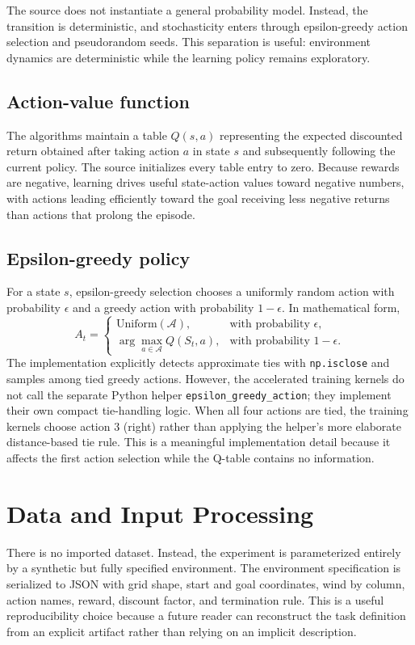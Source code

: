 \documentclass[11pt,a4paper]{article}
\begin{document}
The source does not instantiate a general probability model. Instead, the transition is deterministic, and stochasticity enters through epsilon-greedy action selection and pseudorandom seeds. This separation is useful: environment dynamics are deterministic while the learning policy remains exploratory.

\subsection{Action-value function}
The algorithms maintain a table $Q(s,a)$ representing the expected discounted return obtained after taking action $a$ in state $s$ and subsequently following the current policy. The source initializes every table entry to zero. Because rewards are negative, learning drives useful state-action values toward negative numbers, with actions leading efficiently toward the goal receiving less negative returns than actions that prolong the episode.

\subsection{Epsilon-greedy policy}
For a state $s$, epsilon-greedy selection chooses a uniformly random action with probability $\epsilon$ and a greedy action with probability $1-\epsilon$. In mathematical form,
\begin{equation}
A_t=
\begin{cases}
\text{Uniform}(\mathcal{A}), & \text{with probability }\epsilon,\\
\arg\max\limits_{a\in\mathcal{A}}Q(S_t,a), & \text{with probability }1-\epsilon.
\end{cases}
\label{eq:egreedy}
\end{equation}
The implementation explicitly detects approximate ties with \texttt{np.isclose} and samples among tied greedy actions. However, the accelerated training kernels do not call the separate Python helper \texttt{epsilon\_greedy\_action}; they implement their own compact tie-handling logic. When all four actions are tied, the training kernels choose action $3$ (right) rather than applying the helper's more elaborate distance-based tie rule. This is a meaningful implementation detail because it affects the first action selection while the Q-table contains no information.

\section{Data and Input Processing}
There is no imported dataset. Instead, the experiment is parameterized entirely by a synthetic but fully specified environment. The environment specification is serialized to JSON with grid shape, start and goal coordinates, wind by column, action names, reward, discount factor, and termination rule. This is a useful reproducibility choice because a future reader can reconstruct the task definition from an explicit artifact rather than relying on an implicit description.
\end{document}
